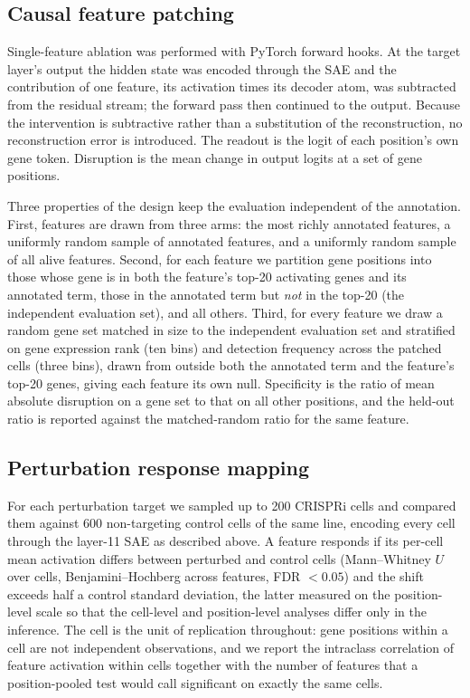 \documentclass[onecolumn,11pt]{article}
\begin{document}
\subsection*{Causal feature patching}

Single-feature ablation was performed with PyTorch forward hooks. At the target layer's output the hidden
state was encoded through the SAE and the contribution of one feature, its activation times its
decoder atom, was subtracted from the residual stream; the forward pass then continued to the
output. Because the intervention is subtractive rather than a substitution of the reconstruction,
no reconstruction error is introduced. The readout is the logit of each position's own gene token. Disruption is the
mean change in output logits at a set of gene positions.

Three properties of the design keep the evaluation independent of the annotation. First, features
are drawn from three arms: the most richly annotated features, a uniformly random sample of
annotated features, and a uniformly random sample of all alive features. Second, for each feature we
partition gene positions into those whose gene is in both the feature's top-20 activating genes and
its annotated term, those in the annotated term but \emph{not} in the top-20 (the independent
evaluation set), and all others. Third, for every feature we draw a random gene set matched in size to the independent evaluation
set and stratified on gene expression rank (ten bins) and detection frequency across the patched
cells (three bins), drawn from outside both the annotated term and the feature's top-20 genes,
giving each feature its own null.
Specificity is the ratio of mean absolute disruption on a gene set to that on all other positions,
and the held-out ratio is reported against the matched-random ratio for the same feature.

\subsection*{Perturbation response mapping}

For each perturbation target we sampled up to 200 CRISPRi cells and compared them against 600
non-targeting control cells of the same line, encoding every cell through the layer-11 SAE as
described above. A feature responds if its per-cell mean activation differs between perturbed and
control cells (Mann--Whitney $U$ over cells, Benjamini--Hochberg across features, FDR $< 0.05$) and
the shift exceeds half a control standard deviation, the latter measured on the position-level
scale so that the cell-level and position-level analyses differ only in the inference. The cell is the unit of replication throughout: gene positions
within a cell are not independent observations, and we report the intraclass correlation of feature
activation within cells together with the number of features that a position-pooled test would call
significant on exactly the same cells.
\end{document}
